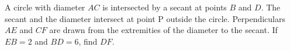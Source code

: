 A circle with diameter $AC$ is intersected by a secant at points $B$ and $D$. The secant and the diameter intersect at point P outside the circle. Perpendiculars $AE$ and $CF$ are drawn from the extremities of the diameter to the secant. If $EB = 2$ and $BD = 6$, find $DF$.
